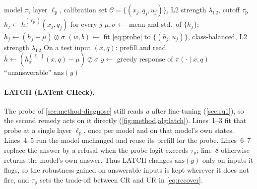 \begin{algorithm}[t]
\caption{\textbf{LATCH: one linear read of the prompt replaces an answer by a
refusal.} Lines 1--3 run once per model; lines 4--8 add no forward pass.}
\label{alg:latch}
\begin{algorithmic}[1]
\Require model $\pi$, layer $\ell_{\mathrm{p}}$, calibration set
  $\mathcal{C} = \{(x_j, q_j, u_j)\}$, L2 strength $\lambda_{\mathrm{L2}}$, cutoff
  $\tau_{\mathrm{p}}$
\State $h_j \gets h^{(\ell_{\mathrm{p}})}_{\pi}(x_j, q_j)$ for every
  $j$ 
\State $\mu, \sigma \gets$ mean and std.\ of $\{h_j\}$;
  $\bar{h}_j \gets (h_j - \mu) \oslash \sigma$
\State $(w, b) \gets$ fit \cref{eq:probe} to $\{(\bar{h}_j, u_j)\}$, class-balanced, L2
  strength $\lambda_{\mathrm{L2}}$
\State On a test input $(x, q)$: prefill and read
  $\bar{h} \gets (h^{(\ell_{\mathrm{p}})}_{\pi}(x, q) - \mu) \oslash \sigma$
\State $y \gets$ greedy response of $\pi(\cdot \mid x, q)$ 
  \State \Return ``unanswerable''
\EndIf
\State \Return $\mathrm{ans}(y)$
\end{algorithmic}
\end{algorithm}

\paragraph{LATCH (LATent CHeck).}
The probe of \cref{sec:method-diagnose} still reads $u$ after fine-tuning (\cref{sec:rq1}),
so the second remedy acts on it directly (\cref{fig:method,alg:latch}). Lines~1--3 fit that probe at a
single layer $\ell_{\mathrm{p}}$, once per model and on that model's own states. Lines~4--5
run the model unchanged and reuse its prefill for the probe. Lines~6--7 replace the answer by
a refusal when the probe logit exceeds $\tau_{\mathrm{p}}$; line~8 otherwise returns the
model's own answer. Thus LATCH changes $\mathrm{ans}(y)$ only on inputs it flags, so
the robustness gained on answerable inputs is kept wherever it does not fire, and
$\tau_{\mathrm{p}}$ sets the trade-off between $\mathrm{CR}$ and $\mathrm{UR}$ in
\cref{eq:recover}.

